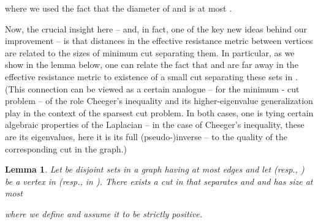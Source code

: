 \documentclass[11pt, letterpaper]{article}
\newtheorem{lemma}[theorem]{Lemma}
\begin{document}
where we used the fact that the diameter of  and  is at most . 

Now, the crucial insight here -- and, in fact, one of the key new ideas behind our improvement -- is that distances in the effective resistance metric between vertices are related to the sizes of minimum cut separating them. In particular, as we show in the lemma below, one can relate the fact that  and  are far away in the effective resistance metric to existence of a small cut separating these sets in . (This connection can be viewed as a certain analogue -- for the minimum - cut problem -- of the role Cheeger's inequality \cite{AlonM85,Alon86} and its higher-eigenvalue generalization \cite{KwokLLOT13} play in the context of the sparsest cut problem. In both cases, one is tying certain algebraic properties of the Laplacian -- in the case of Cheeger's inequality, these are its eigenvalues, here it is its full (pseudo-)inverse -- to the quality of the corresponding cut in the graph.)


\begin{lemma} \label{lem:good_cut}
Let  be disjoint sets in a graph  having at most  edges and let  (resp., ) be a vertex in  (resp., in ). There exists a cut  in  that separates  and  and has size at most
 
where we define  and assume it to be strictly positive.
\end{lemma}
\end{document}
